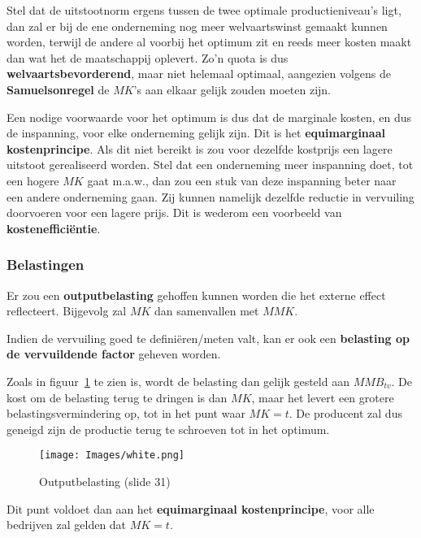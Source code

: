 Stel dat de uitstootnorm ergens tussen de twee optimale productieniveau's ligt, dan zal er bij de ene onderneming nog meer welvaartswinst gemaakt kunnen worden, terwijl de andere al voorbij het optimum zit en reeds meer kosten maakt dan wat het de maatschappij oplevert. Zo'n quota is dus \textbf{welvaartsbevorderend}, maar niet helemaal optimaal, aangezien volgens de \textbf{Samuelsonregel} de $MK$'s aan elkaar gelijk zouden moeten zijn.

Een nodige voorwaarde voor het optimum is dus dat de marginale kosten, en dus de inspanning, voor elke onderneming gelijk zijn. Dit is het \textbf{equimarginaal kostenprincipe}. Als dit niet bereikt is zou voor dezelfde kostprijs een lagere uitstoot gerealiseerd worden. Stel dat een onderneming meer inspanning doet, tot een hogere $MK$ gaat m.a.w., dan zou een stuk van deze inspanning beter naar een andere onderneming gaan. Zij kunnen namelijk dezelfde reductie in vervuiling doorvoeren voor een lagere prijs. Dit is wederom een voorbeeld van \textbf{kosteneffici\"entie}.

\subsubsection{Belastingen}
Er zou een \textbf{outputbelasting} gehoffen kunnen worden die het externe effect reflecteert. Bijgevolg zal $MK$ dan samenvallen met $MMK$.

Indien de vervuiling goed te defini\"eren/meten valt, kan er ook een \textbf{belasting op de vervuildende factor} geheven worden.

Zoals in figuur~\ref{fig:outputBelasting} te zien is, wordt de belasting dan gelijk gesteld aan $MMB_{tv}$. De kost om de belasting terug te dringen is dan $MK$, maar het levert een grotere belastingsvermindering op, tot in het punt waar $MK = t$. De producent zal dus geneigd zijn de productie terug te schroeven tot in het optimum.

\begin{figure}[htbp]
   \centering
   \texttt{[image: Images/white.png]}
   \caption{Outputbelasting (slide 31)}
   \label{fig:outputBelasting}
\end{figure}

Dit punt voldoet dan aan het \textbf{equimarginaal kostenprincipe}, voor alle bedrijven zal gelden dat $MK = t$.

